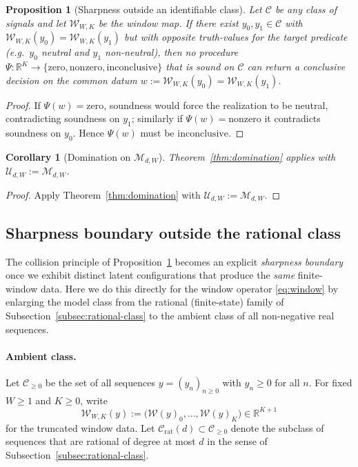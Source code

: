 \documentclass[11pt,reqno]{amsart}
\newtheorem{proposition}[theorem]{Proposition}
\newtheorem{corollary}[theorem]{Corollary}
\theoremstyle{definition}
\theoremstyle{remark}
\newcommand{\R}{\mathbb{R}}
\newcommand{\1}{\mathbf{1}}
\newcommand{\zero}{\mathrm{zero}}
\newcommand{\nonzero}{\mathrm{nonzero}}
\newcommand{\inconclusive}{\mathrm{inconclusive}}
\begin{document}
\begin{proposition}[Sharpness outside an identifiable class]\label{prop:sharpness-collision}
Let $\mathcal C$ be any class of signals and let $\mathcal W_{W,K}$ be the window map.
If there exist $y_0,y_1\in\mathcal C$ with $\mathcal W_{W,K}(y_0)=\mathcal W_{W,K}(y_1)$ but with opposite truth-values for the target predicate (e.g.\ $y_0$ neutral and $y_1$ non-neutral),
then no procedure $\Psi:\R^K\to\{\zero,\nonzero,\inconclusive\}$ that is sound on $\mathcal C$ can return a conclusive decision on the common datum $w:=\mathcal W_{W,K}(y_0)=\mathcal W_{W,K}(y_1)$.
\end{proposition}

\begin{proof}
If $\Psi(w)=\zero$, soundness would force the realization to be neutral, contradicting soundness on $y_1$; similarly if $\Psi(w)=\nonzero$ it contradicts soundness on $y_0$.
Hence $\Psi(w)$ must be $\inconclusive$.
\end{proof}


\begin{corollary}[Domination on $\mathcal M_{d,W}$]\label{cor:domination-on-Mdw}
Theorem~\ref{thm:domination} applies with $\mathcal U_{d,W}:=\mathcal M_{d,W}$.
\end{corollary}

\begin{proof}
Apply Theorem~\ref{thm:domination} with $\mathcal U_{d,W}:=\mathcal M_{d,W}$.
\end{proof}


\subsection{Sharpness boundary outside the rational class}\label{subsec:sharpness-outside-rational}

The collision principle of Proposition~\ref{prop:sharpness-collision} becomes an explicit
\emph{sharpness boundary} once we exhibit distinct latent configurations that produce the
\emph{same} finite-window data.
Here we do this directly for the window operator \eqref{eq:window} by enlarging the model class
from the rational (finite-state) family of Subsection~\ref{subsec:rational-class} to the ambient class of
all non-negative real sequences.

\paragraph{Ambient class.}
Let $\mathcal C_{\ge 0}$ be the set of all sequences $y=(y_n)_{n\ge 0}$ with $y_n\ge 0$ for all $n$.
For fixed $W\ge 1$ and $K\ge 0$, write
\[
\mathcal W_{W,K}(y):=\bigl(\mathcal W(y)_0,\dots,\mathcal W(y)_K\bigr)\in\R^{K+1}
\]
for the truncated window data.
Let $\mathcal C_{\mathrm{rat}}(d)\subset \mathcal C_{\ge 0}$ denote the subclass of sequences that are
rational of degree at most $d$ in the sense of Subsection~\ref{subsec:rational-class}.
\end{document}
